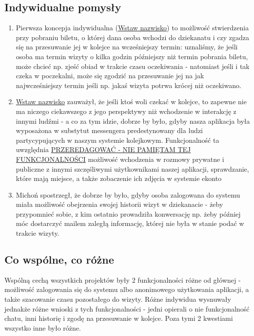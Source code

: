 \documentclass[12pt]{article}
\begin{document}
\subsection {Indywidualne pomysły}
\begin {enumerate}
	\item Pierwsza koncepja indywidualna (\underline{Wstaw nazwisko}) to możliwość stwierdzenia przy pobraniu biletu, o której dana osoba wchodzi do dziekanatu i czy zgadza się na przesuwanie jej w kolejce na wcześniejszy termin: uznaliśmy, że jeśli osoba ma termin wizyty o kilka godzin późniejszy niż termin pobrania biletu, może chcieć np. zjeść obiad w trakcie czasu oczekiwania - natomiast jeśli i tak czeka w poczekalni, może się zgodzić na przesuwanie jej na jak najwcześniejszy termin jeśli np. jakaś wizyta potrwa krócej niż oczekiwano.
	
	\item \underline{Wstaw nazwisko} zauważył, że jeśli ktoś woli czekać w kolejce, to zapewne nie ma niczego ciekawszego z jego perspektywy niż wchodzenie w interakcję z innymi ludźmi - a co za tym idzie, dobrze by było, gdyby nasza aplikacja była wyposażona w substytut messengera predestynowany dla ludzi partycypujących w naszym systemie kolejkowym. Funkcjonalność ta uwzględnia \underline{PRZEREDAGOWAĆ - NIE PAMIĘTAM TEJ FUNKCJONALNOŚCI} możliwość wchodzenia w rozmowy prywatne i publiczne z innymi szczęśliwymi użytkownikami naszej aplikacji, sprawdzanie, które mają miejsce, a także zobaczenie ich zdjęcia w systemie ekonto
	
	\item Michoń spostrzegł, że dobrze by było, gdyby osoba zalogowana do systemu miała możliwość obejrzenia swojej historii wizyt w dziekanacie - żeby przypomnieć sobie, z kim ostatnio prowadziła konwersację np. żeby później móc dostarczyć mailem zaległą informację, której nie była w stanie podać w trakcie wizyty.

\end {enumerate}

\subsection {Co wspólne, co różne}
Wspólną cechą wszystkich projektów były 2 funkcjonalności różne od głównej - możliwość zalogowania się do systemu albo anonimowego użytkowania aplikacji, a także szacowanie czasu pozostałego do wizyty. Różne indywidua wysnuwały jednakże różne wnioski z tych funkcjonalności - jedni opierali o nie funkcjonalność chatu, inni historię i zgodę na przesuwanie w kolejce. Poza tymi 2 kwestiami wszystko inne było różne.
\end{document}
